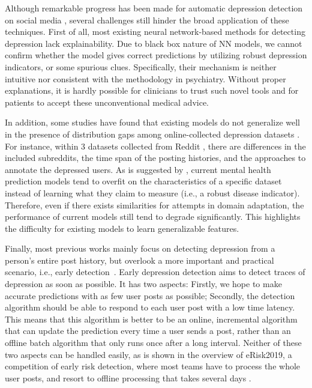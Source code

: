 Although remarkable progress has been made for automatic depression detection on social media \citep{trotzek2018utilizing, gui2019cooperative, zogan2021depressionnet}, several challenges still hinder the broad application of these techniques. First of all, most existing neural network-based methods for detecting depression lack explainability. Due to black box nature of NN models, we cannot confirm whether the model gives correct predictions by utilizing robust depression indicators, or some spurious clues. Specifically, their mechanism is neither intuitive nor 
consistent with the methodology in psychiatry. Without proper explanations, it is hardly possible for clinicians to trust such novel tools and for patients to accept these unconventional medical advice.

In addition, some studies have found that existing models do not generalize well 
in the presence of distribution gaps among online-collected depression 
datasets \citep{harrigian2020models}. For instance, within 3 datasets collected 
from Reddit \citep{losada2016test, yates2017depression, wolohan2018detecting}, 
there are differences in the included subreddits, the time span of the posting 
histories, and the approaches to annotate the depressed users. As is suggested by \citet{ernala2019methodological}, current mental health prediction models tend to overfit on the characteristics of a specific dataset instead of learning what they 
claim to measure (i.e., a robust disease indicator). Therefore, even if there exists similarities for attempts in domain adaptation, the performance of current models still tend to degrade significantly. This highlights the difficulty for existing models to learn generalizable features.

Finally, most previous works mainly focus on detecting depression from a person's entire post history, but overlook a more important and practical scenario, i.e.,
early detection~\citep{losada2017erisk}. Early depression detection aims to detect traces of depression as soon as possible. It has two aspects: Firstly, we hope to make accurate predictions with as few user posts as possible; Secondly, the detection algorithm should be able to respond to each user post with a low time latency. This means that this algorithm is better to be an online, incremental algorithm that can update the prediction every time a user sends a post, rather than an offline batch algorithm that only runs once after a long interval. Neither of these two aspects can be handled easily, as is shown in the overview of eRisk2019, a competition of early risk detection, where most teams have to process the whole user posts, and resort to offline processing that takes several days \citep{losada2019overview}. 

